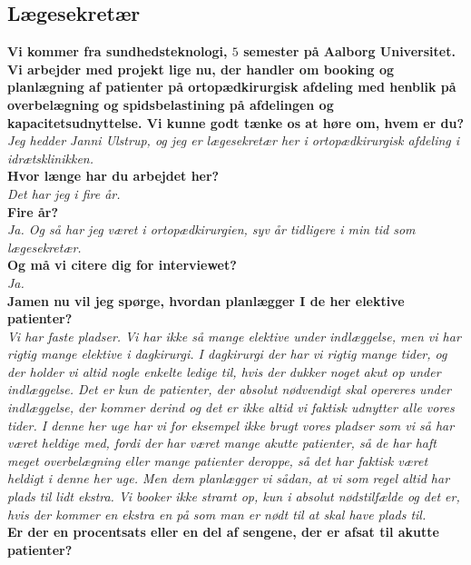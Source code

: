 \subsection{Lægesekretær} \label{bilagsek}
\textbf{Vi kommer fra sundhedsteknologi, $5$ semester på Aalborg Universitet. Vi arbejder med projekt lige nu, der handler om booking og planlægning af patienter på ortopædkirurgisk afdeling med henblik på overbelægning og spidsbelastining på afdelingen og kapacitetsudnyttelse. Vi kunne godt tænke os at høre om, hvem er du?}\\
\noindent
\textit{Jeg hedder Janni Ulstrup, og jeg er lægesekretær her i ortopædkirurgisk afdeling i idrætsklinikken.} \\
\noindent
\textbf{Hvor længe har du arbejdet her?} \\
\noindent
\textit{Det har jeg i fire år.} \\
\noindent
\textbf{Fire år?} \\
\noindent
\textit{Ja. Og så har jeg været i ortopædkirurgien, syv år tidligere i min tid som lægesekretær.} \\
\noindent
\textbf{Og må vi citere dig for interviewet?}\\
\noindent
\textit{Ja.} \\
\noindent
\textbf{Jamen nu vil jeg spørge, hvordan planlægger I de her elektive patienter?}\\
\noindent
\textit{Vi har faste pladser. Vi har ikke så mange elektive under indlæggelse, men vi har rigtig mange elektive i dagkirurgi. I dagkirurgi der har vi rigtig mange tider, og der holder vi altid nogle enkelte ledige til, hvis der dukker noget akut op under indlæggelse. Det er kun de patienter, der absolut nødvendigt skal opereres under indlæggelse, der kommer derind og det er ikke altid vi faktisk udnytter alle vores tider. I denne her uge har vi for eksempel ikke brugt vores pladser som vi så har været heldige med, fordi der har været mange akutte patienter, så de har haft meget overbelægning eller mange patienter deroppe, så det har faktisk været heldigt i denne her uge. Men dem planlægger vi sådan, at vi som regel altid har plads til lidt ekstra. Vi booker ikke stramt op, kun i absolut nødstilfælde og det er, hvis der kommer en ekstra en på som man er nødt til at skal have plads til.}\\
\textbf{Er der en procentsats eller en del af sengene, der er afsat til akutte patienter?}\\
\noindent

